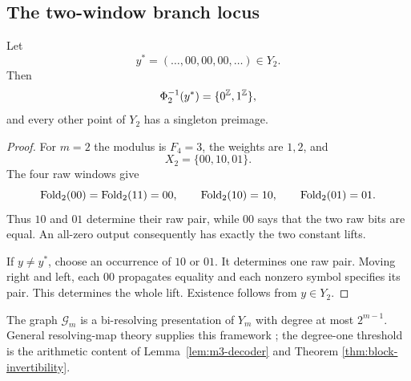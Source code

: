 \subsection{The two-window branch locus}
\label{sec:stab:branch-and-conjugacy}

\begin{theorem}\label{thm:m2-branch-locus}
Let
\[
y^*=(\ldots,00,00,00,\ldots)\in Y_2.
\]
Then
\[
\Phi_2^{-1}(y^*)=\{0^{\mathbb{Z}},1^{\mathbb{Z}}\},
\]
and every other point of $Y_2$ has a singleton preimage.
\end{theorem}

\begin{proof}
For $m=2$ the modulus is $F_4=3$, the weights are $1,2$, and
\[
X_2=\{00,10,01\}.
\]
The four raw windows give
\[
\mathrm{Fold}_2(00)=\mathrm{Fold}_2(11)=00,
\qquad \mathrm{Fold}_2(10)=10,
\qquad \mathrm{Fold}_2(01)=01.
\]
Thus $10$ and $01$ determine their raw pair, while $00$ says that the two
raw bits are equal.  An all-zero output consequently has exactly the two
constant lifts.

If $y\ne y^*$, choose an occurrence of $10$ or $01$.  It determines one raw
pair.  Moving right and left, each $00$ propagates equality and each nonzero
symbol specifies its pair.  This determines the whole lift.  Existence
follows from $y\in Y_2$.
\end{proof}

\begin{remark}\label{rem:sofic-comparison}
The graph $\mathcal G_m$ is a bi-resolving presentation of $Y_m$ with degree
at most $2^{m-1}$.  General resolving-map theory supplies this framework
\cite{LindMarcus1995,Ashley1991,Boyle1983}; the degree-one threshold is the
arithmetic content of Lemma~\ref{lem:m3-decoder} and Theorem
\ref{thm:block-invertibility}.
\end{remark}

